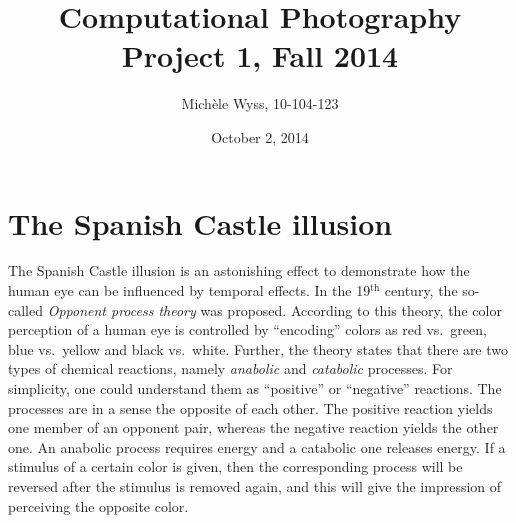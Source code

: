 \documentclass[a4paper]{article}
\title{Computational Photography \\ Project 1, Fall 2014}
\author{Mich\`ele Wyss, 10-104-123}
\date{October 2, 2014}
\begin{document}
\maketitle
\section{The Spanish Castle illusion}
The Spanish Castle illusion is an astonishing effect to demonstrate how the human eye can be influenced by temporal effects.  In the 19$^{\text{th}}$ century, the so-called \emph{Opponent process theory} was proposed. According to this theory, the color perception of a human eye is controlled by ``encoding'' colors as red vs.\ green,  blue vs.\ yellow and black vs.\ white. Further, the theory states that there are two types of chemical reactions, namely \emph{anabolic} and \emph{catabolic} processes. For simplicity, one could understand them as ``positive'' or ``negative'' reactions. The processes are in a sense the opposite of each other. The positive reaction yields one member of an opponent pair, whereas the negative reaction yields the other one. An anabolic process requires energy and a catabolic one releases energy. If a stimulus of a certain color is given, then the corresponding process will be reversed after the stimulus is removed again, and this will give the impression of perceiving the opposite color.
\end{document}
